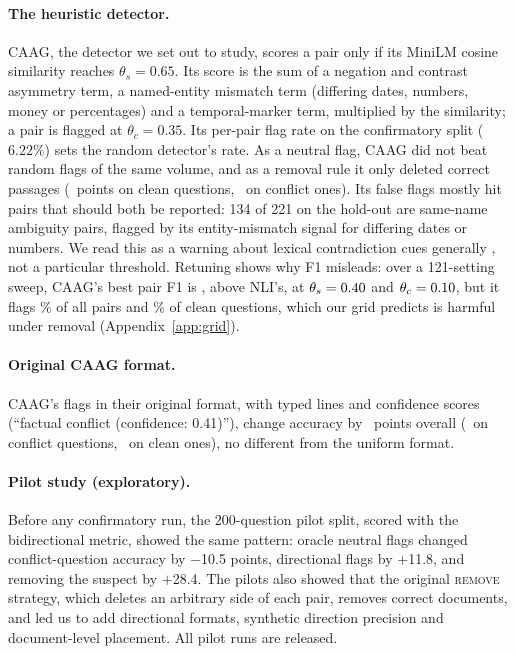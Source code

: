 \paragraph{The heuristic detector.}
CAAG, the detector we set out to study, scores a pair only if its MiniLM \citep{reimers2019sbert} cosine similarity reaches $\theta_s=0.65$. Its score
is the sum of a negation and contrast asymmetry term, a named-entity mismatch term (differing dates, numbers, money or
percentages) and a temporal-marker term, multiplied by the similarity; a pair is flagged at
$\theta_c=0.35$. Its per-pair flag rate on the confirmatory split ($6.22\%$) sets the random detector's rate.
As a neutral flag, CAAG did not beat random flags of the same volume, and
as a removal rule it only deleted correct passages (\dCaagRemClean\ points on clean questions, \dCaagRemConf\ on
conflict ones). Its false flags mostly hit pairs that should both be reported: 134 of 221 on the
hold-out are same-name ambiguity pairs, flagged by its entity-mismatch signal for differing dates or
numbers. We read this as a warning about lexical contradiction cues generally \citep{gururangan2018annotation},
not a particular threshold. Retuning shows why F1 misleads: over a 121-setting sweep, CAAG's
best pair F1 is \caagBestFOne, above NLI's, at $\theta_s=0.40$ and $\theta_c=0.10$, but it flags \caagBestRate\% of all pairs and \caagBestCleanFpr\% of clean questions, which our grid predicts
is harmful under removal (Appendix~\ref{app:grid}).

\paragraph{Original CAAG format.}
CAAG's flags in their original format, with typed lines and confidence scores (``factual conflict (confidence:
0.41)''), change accuracy by \origCaagAll\ points overall (\origCaagConf\ on conflict questions, \origCaagClean\ on
clean ones), no different from the uniform format.

\paragraph{Pilot study (exploratory).}
Before any confirmatory run, the 200-question pilot split, scored with the bidirectional metric, showed the same
pattern: oracle neutral flags changed conflict-question accuracy by $-$10.5 points, directional flags by
$+$11.8, and removing the suspect by $+$28.4. The pilots also showed that the original \textsc{remove} strategy,
which deletes an arbitrary side of each pair, removes correct documents, and led us to add directional formats,
synthetic direction precision and document-level placement. All pilot runs are released.

